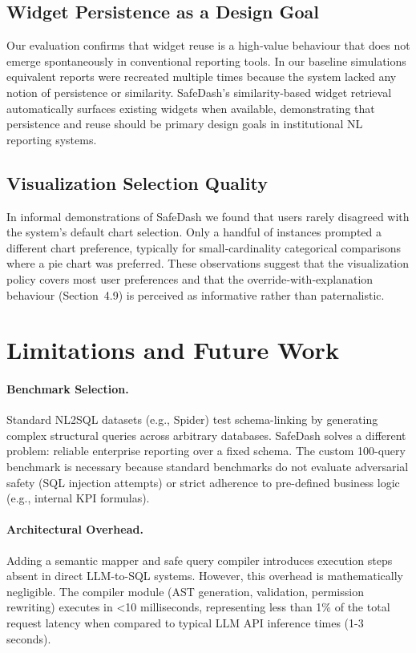 \documentclass[11pt]{article}
\begin{document}
\subsection{Widget Persistence as a Design Goal}
Our evaluation confirms that widget reuse is a high‑value behaviour that does not emerge spontaneously in conventional reporting tools. In our baseline simulations equivalent reports were recreated multiple times because the system lacked any notion of persistence or similarity. SafeDash’s similarity‑based widget retrieval automatically surfaces existing widgets when available, demonstrating that persistence and reuse should be primary design goals in institutional NL reporting systems.

\subsection{Visualization Selection Quality}
In informal demonstrations of SafeDash we found that users rarely disagreed with the system’s default chart selection. Only a handful of instances prompted a different chart preference, typically for small‑cardinality categorical comparisons where a pie chart was preferred. These observations suggest that the visualization policy covers most user preferences and that the override‑with‑explanation behaviour (Section 4.9) is perceived as informative rather than paternalistic.

\section{Limitations and Future Work\label{sec:limitations}}
\paragraph{Benchmark Selection.} Standard NL2SQL datasets (e.g., Spider) test schema-linking by generating complex structural queries across arbitrary databases. SafeDash solves a different problem: reliable enterprise reporting over a fixed schema. The custom 100-query benchmark is necessary because standard benchmarks do not evaluate adversarial safety (SQL injection attempts) or strict adherence to pre-defined business logic (e.g., internal KPI formulas).

\paragraph{Architectural Overhead.} Adding a semantic mapper and safe query compiler introduces execution steps absent in direct LLM-to-SQL systems. However, this overhead is mathematically negligible. The compiler module (AST generation, validation, permission rewriting) executes in <10 milliseconds, representing less than 1\% of the total request latency when compared to typical LLM API inference times (1-3 seconds).
\end{document}

